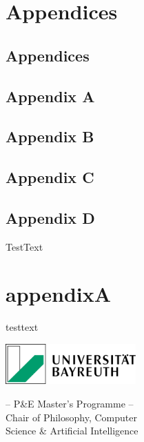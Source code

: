 \documentclass[
  letterpaper,
]{book}
\begin{document}
\cleardoublepage
{}
{}
\appendix

\chapter{Appendices}\label{appendices-1}

\section{Appendices}\label{appendices-2}

\section{Appendix A}\label{appendix-a}

\section{Appendix B}\label{appendix-b}

\section{Appendix C}\label{appendix-c}

\section{Appendix D}\label{appendix-d}

TestText

\chapter{appendixA}\label{appendixa}

testtext


\backmatter


\clearpage
\thispagestyle{empty} %

\newpage


\begin{minipage}{0.3\textwidth}
  \includegraphics[width=5cm]{latex/uni-bayreuth-logo.png}
\end{minipage}
\hfill
\begin{minipage}{0.9\textwidth}
  \begin{center}
    -- P\&E Master's Programme --\\
    Chair of Philosophy, Computer\\
    Science \& Artificial Intelligence
  \end{center}
\end{minipage}
\end{document}
